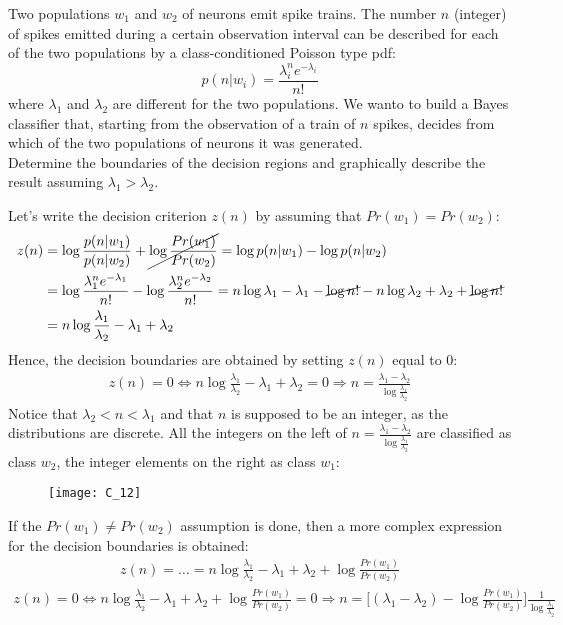 \Exercise[number={12}]
Two populations \(w_1\) and \(w_2\) of neurons emit spike trains. The
number \(n\) (integer) of spikes emitted during a certain observation
interval can be described for each of the two populations by a
class-conditioned Poisson type pdf:
\[
    p(n|w_i)=\frac{\lambda_i^n e^{-\lambda_i}}{n!}
\]
where \(\lambda_1\) and \(\lambda_2\) are different for the two
populations. We wanto to build a Bayes classifier that, starting from
the observation of a train of \(n\) spikes, decides from which of the
two populations of neurons it was generated.\\
Determine the boundaries of the decision regions and graphically
describe the result assuming \(\lambda_1>\lambda_2\).

\Answer[number={12}]
Let's write the decision criterion \(z(n)\) by assuming that
\(Pr(w_1)=Pr(w_2)\):
\begin{align*}
    z(n)
    &=\log{\frac{p(n|w_1)}{p(n|w_2)}}+\cancel{\log{\frac{Pr(w_1)}{Pr(w_2)}}}
    =\log{p(n|w_1)}-\log{p(n|w_2)}\\
    &=\log{\frac{\lambda_1^n e^{-\lambda_1}}{n!}}-\log{\frac{\lambda_2^n e^{-\lambda_2}}{n!}}
    =n\log{\lambda_1}-\lambda_1-\cancel{\log{n!}}-n\log{\lambda_2}+\lambda_2+\cancel{\log{n!}}\\
    &=n\log{\frac{\lambda_1}{\lambda_2}}-\lambda_1+\lambda_2
\end{align*}
Hence, the decision boundaries are obtained by setting \(z(n)\) equal to 0:
\begin{align*}
    z(n)=0
    \Longleftrightarrow
    n\log{\frac{\lambda_1}{\lambda_2}}-\lambda_1+\lambda_2=0
    \Rightarrow
    n=\frac{\lambda_1-\lambda_2}{\log{\frac{\lambda_1}{\lambda_2}}}
\end{align*}
Notice that \(\lambda_2<n<\lambda_1\) and that \(n\) is supposed to be an
integer, as the distributions are discrete. All the integers on the
left of \(n=\frac{\lambda_1-\lambda_2}{\log{\frac{\lambda_1}{\lambda_2}}}\)
are classified as class \(w_2\), the integer elements on the right as
class \(w_1\):
\begin{figure}[H]
    \texttt{[image: C\_12]}
    \centering
\end{figure}
If the \(Pr(w_1)\neq{Pr(w_2)}\) assumption is done, then a more complex
expression for the decision boundaries is obtained:
\begin{align*}
    z(n)
    =\dots
    =n\log{\frac{\lambda_1}{\lambda_2}}-\lambda_1+\lambda_2+\log{\frac{Pr(w_1)}{Pr(w_2)}}
\end{align*}
\begin{align*}
    z(n)=0
    \Longleftrightarrow
    n\log{\frac{\lambda_1}{\lambda_2}}-\lambda_1+\lambda_2+\log{\frac{Pr(w_1)}{Pr(w_2)}}=0
    \Rightarrow
    n=\biggl[(\lambda_1-\lambda_2)-\log{\frac{Pr(w_1)}{Pr(w_2)}}\biggr]\frac{1}{\log{\frac{\lambda_1}{\lambda_2}}}
\end{align*}